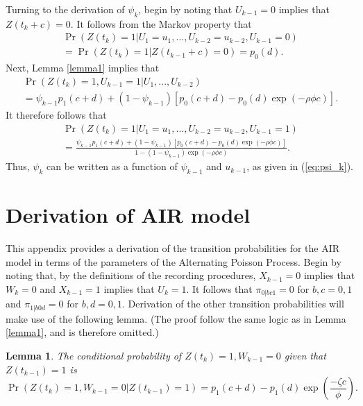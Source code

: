 \documentclass[man, noextraspace, floatsintext]{apa6}\usepackage[]{graphicx}\usepackage[]{color}
\newtheorem{lemma}{Lemma}
\begin{document}
Turning to the derivation of $\psi_k$, begin by noting that $U_{k-1} = 0$ implies that $Z(t_k + c) = 0$. 
It follows from the Markov property that 
\begin{multline*}
\Pr\left(Z(t_k) = 1 \left| U_1 = u_1,...,U_{k-2} = u_{k-2}, U_{k-1} = 0 \right.\right) \\ 
= \Pr\left(Z(t_k) = 1 \left| Z(t_{k-1} + c) = 0 \right.\right) = p_0(d).
\end{multline*}
Next, Lemma \ref{lemma1} implies that \begin{multline*}
\Pr\left(Z(t_k) = 1, U_{k-1} = 1 \left| U_1,...,U_{k-2} \right.\right) \\
= \psi_{k-1} p_1(c + d) + (1 - \psi_{k-1}) \left[p_0(c + d) - p_0(d) \exp\left(-\rho\phi c\right)\right].
\end{multline*}
It therefore follows that 
\begin{multline*}
\Pr\left(Z(t_k) = 1 \left| U_1 = u_1,...,U_{k-2} = u_{k-2}, U_{k-1} = 1 \right.\right) \\
= \frac{\psi_{k-1} p_1(c + d) + (1 - \psi_{k-1}) \left[p_0(c + d) - p_0(d) \exp\left(-\rho\phi c\right)\right]}{1 - (1 - \psi_{k-1})\exp\left(-\rho\phi c\right)}.
\end{multline*}
Thus, $\psi_k$ can be written as a function of $\psi_{k-1}$ and $u_{k-1}$, as given in (\ref{eq:psi_k}).

\section{Derivation of AIR model}
\label{app:AIR_derivation}

This appendix provides a derivation of the transition probabilities for the AIR model in terms of the parameters of the Alternating Poisson Process. Begin by noting that, by the definitions of the recording procedures, $X_{k-1} = 0$ implies that $W_k = 0$ and $X_{k-1} = 1$ implies that $U_k = 1$. It follows that $\pi_{0|bc1} = 0$ for $b,c = 0,1$ and $\pi_{1|b0d} = 0$ for $b,d=0,1$. Derivation of the other transition probabilities will make use of the following lemma. (The proof follow the same logic as in Lemma \ref{lemma1}, and is therefore omitted.)

\begin{lemma}
\label{lemma2}
The conditional probability of $Z(t_k) = 1, W_{k-1} = 0$ given that $Z(t_{k-1}) = 1$ is
\[
\Pr\left(Z(t_k) = 1, W_{k-1} = 0 \left| Z(t_{k-1}) = 1 \right.\right) = p_1(c + d) - p_1(d) \exp\left(\frac{- \zeta c}{\phi}\right). \]
\end{lemma}
\end{document}
